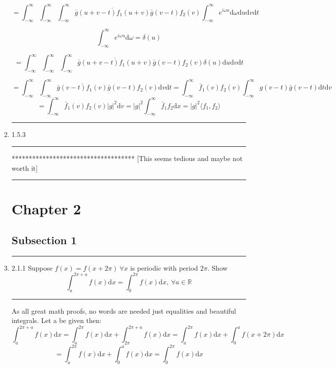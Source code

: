 \documentclass[12pt]{article}
\newcommand{\RR}{\mathbb{R}}
\newcommand{\di}{\mathrm{d}}
\newcommand{\intinf}{\int_{-\infty}^\infty}
\theoremstyle{definition}
\begin{document}
\begin{enumerate}
\[
=
\intinf \intinf 
\intinf  
\overline{
\bar g(u+v-t)  f_1(u+v) 
}
\bar g(v-t)  f_2(v) 
\intinf
e^{i\omega u}
\di \omega 
\di u \di v
\di t
\]

\[
\intinf
e^{i\omega u}
\di \omega 
= \delta( u)
\]

\[
=
\intinf \intinf 
\intinf  
\overline{
\bar g(u+v-t)  f_1(u+v) 
}
\bar g(v-t)  f_2(v) 
\delta(u)
\di u \di v
\di t
\]

\[
=
\intinf \intinf 
\overline{
\bar g(v-t)  f_1(v) 
}
\bar g(v-t)  f_2(v) 
 \di v
\di t
=
\intinf 
\bar  f_1(v)  f_2(v) 
 \intinf g(v-t)\bar g(v-t) 
\di t
 \di v
\]
\[
=
\intinf 
\bar  f_1(v)  f_2(v) 
|g|^2
 \di v
=
|g|^2
\intinf \bar f_1 f_2 \di x
= |g|^2 \langle f_1, f_2 \rangle
\]

\hrule
\item 1.5.3
\hrule
    
    ************************************
    [This seems tedious and maybe not worth it]

\hrule

\section{Chapter 2}
\subsection{Subsection 1}
\hrule
\item 2.1.1
Suppose $f(x) =f(x+2\pi) \ \forall x$ is periodic with period $2\pi$.
Show 
\[
\int_a^{2\pi +a} f(x) \di x
=
\int_0^{2\pi} f(x) \di x
, \ \forall a \in \RR
\]
\hrule
As all great math proofs, no words are needed just equalities and beautiful integrals.
Let a be given then:
\[
\int_a^{2\pi +a} f(x) \di x
=
\int_a^{2\pi} f(x) \di x +
\int_{2\pi}^{2\pi +a} f(x) \di x
=
\int_a^{2\pi} f(x) \di x +
\int_{0}^{a} f(x+2\pi) \di x
\]
\[
=
\int_a^{2\pi} f(x) \di x +
\int_{0}^{a} f(x) \di x
=
\int_0^{2\pi} f(x) \di x
\]


\end{enumerate}
\end{document}
